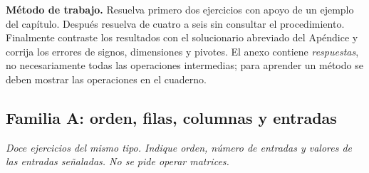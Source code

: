 \documentclass[12pt]{article}
\theoremstyle{remark}
\begin{document}
\textbf{Método de trabajo.} Resuelva primero dos ejercicios con apoyo de un ejemplo del capítulo. Después resuelva de cuatro a seis sin consultar el procedimiento. Finalmente contraste los resultados con el solucionario abreviado del Apéndice y corrija los errores de signos, dimensiones y pivotes. El anexo contiene \emph{respuestas}, no necesariamente todas las operaciones intermedias; para aprender un método se deben mostrar las operaciones en el cuaderno.
\subsection{Familia A: orden, filas, columnas y entradas}\noindent\textit{Doce ejercicios del mismo tipo. Indique orden, número de entradas y valores de las entradas señaladas. No se pide operar matrices.}\par\medskip
\end{document}
